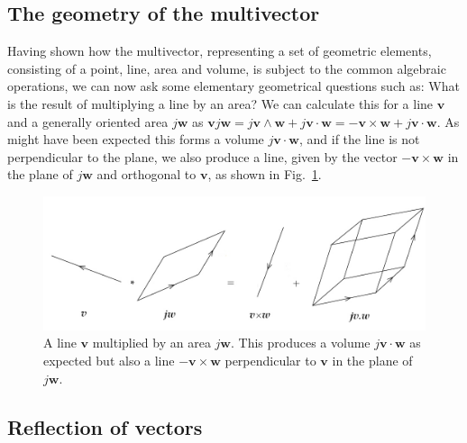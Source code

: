 \documentclass[prb,preprint]{revtex4}
\newcommand{\iGA}{{j}}
\begin{document}
\subsection{The geometry of the multivector}

Having shown how the multivector, representing a set of geometric elements, consisting of a point, line, area and volume, is subject to the common algebraic operations, we can now ask some elementary geometrical questions such as: What is the result of multiplying a line by an area? We can calculate this for a line $ \boldsymbol{v} $ and a generally oriented area $ \iGA \boldsymbol{w} $ as $ \boldsymbol{v} \iGA \boldsymbol{w} = \iGA \boldsymbol{v} \wedge \boldsymbol{w} + \iGA \boldsymbol{v} \cdot \boldsymbol{w} = - \boldsymbol{v} \times \boldsymbol{w} + \iGA \boldsymbol{v} \cdot \boldsymbol{w} $.  As might have been expected this forms a volume $ \iGA \boldsymbol{v} \cdot \boldsymbol{w} $, and if the line is not perpendicular to the plane, we also produce a line, given by the vector $ - \boldsymbol{v} \times \boldsymbol{w} $ in the plane of $ \iGA \boldsymbol{w} $ and orthogonal to $ \boldsymbol{v} $, as shown in Fig.~\ref{LineArea}.

\begin{figure}[htb]

\begin{center}
\includegraphics[width=5.4in]{LineTimesArea}
\end{center}

\caption{A line $ \boldsymbol{v} $ multiplied by an area $ \iGA \boldsymbol{w} $. This produces a volume $ \iGA \boldsymbol{v} \cdot \boldsymbol{w} $ as expected but also a line $ - \boldsymbol{v} \times \boldsymbol{w} $ perpendicular to $ \boldsymbol{v} $ in the plane of $ \iGA \boldsymbol{w} $. \label{LineArea}}

\end{figure}



\subsection{Reflection of vectors}
\end{document}
